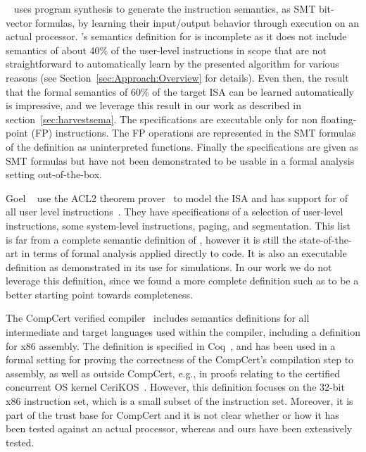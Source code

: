 \Strata~\cite{Heule2016a} uses program synthesis to generate the instruction
semantics, as SMT bit-vector formulas, by learning their input/output behavior
through execution on an actual processor. \Strata's semantics definition for
\ISA is incomplete as it does not include semantics of about 40\% of the
user-level instructions in scope that are not straightforward to automatically learn by the presented algorithm for various reasons (see Section~\ref{sec:Approach:Overview} for details). Even then,
the result that the formal semantics of 60\% of the target \ISA ISA can be learned automatically
is impressive, and we leverage this result in our work as described in
section~\ref{sec:harvestsema}.
The specifications are executable only for non floating-point (FP) instructions.
The FP operations are represented in the SMT formulas of the definition as
uninterpreted functions. Finally the specifications are given as SMT formulas
but have not been demonstrated to be usable in a formal analysis setting out-of-the-box.

Goel \etal~\cite{Goel:FMCAD14} use the ACL2 theorem prover~\cite{ACL2:Kaufmann2000} to model the \ISA ISA and has support for
\goelPerc{} of all user level instructions~\cite{GoelList}. They have specifications of a selection
of user-level instructions, some system-level instructions, paging, and
segmentation. This list is far from a complete semantic definition of \ISA,
however it is still the state-of-the-art in terms of formal analysis applied
directly to \ISA code. It is also an executable definition as demonstrated in
its use for simulations. In our work we do not leverage this definition, since
we found a more complete definition such as \Strata to be a better starting
point towards completeness.

The CompCert verified compiler~\cite{Leroy:2009} includes semantics
definitions for all intermediate and target languages used within the compiler,
including a definition for x86 assembly. The definition is specified in Coq~\cite{Coq}, and has been used in a formal
setting for proving the correctness of the CompCert's compilation step to assembly,
as well as outside CompCert, e.g., in proofs relating to the certified concurrent
OS kernel CeriKOS~\cite{Gu:2016}. However, this definition focuses on the
32-bit x86 instruction set, which is a small subset of the \ISA instruction 
set.
Moreover, it is part of the trust base for CompCert and it is not clear
whether or how it has been tested against an actual processor, whereas
\Strata and ours have been extensively tested.

